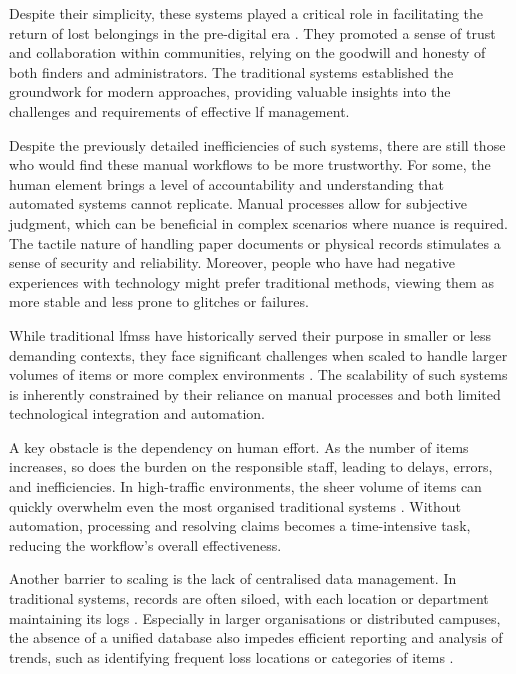 Despite their simplicity, these systems played a critical role in facilitating the return of lost belongings in the pre-digital era \cite{Mayura2024}. They promoted a sense of trust and collaboration within communities, relying on the goodwill and honesty of both finders and administrators. The traditional systems established the groundwork for modern approaches, providing valuable insights into the challenges and requirements of effective \ac{lf} management.

Despite the previously detailed inefficiencies of such systems, there are still those who would find these manual workflows to be more trustworthy. For some, the human element brings a level of accountability and understanding that automated systems cannot replicate. Manual processes allow for subjective judgment, which can be beneficial in complex scenarios where nuance is required. The tactile nature of handling paper documents or physical records stimulates a sense of security and reliability. Moreover, people who have had negative experiences with technology might prefer traditional methods, viewing them as more stable and less prone to glitches or failures.


While traditional \acp{lfms} have historically served their purpose in smaller or less demanding contexts, they face significant challenges when scaled to handle larger volumes of items or more complex environments \cite{Mayura2024}. The scalability of such systems is inherently constrained by their reliance on manual processes and both limited technological integration and automation.

A key obstacle is the dependency on human effort. As the number of items increases, so does the burden on the responsible staff, leading to delays, errors, and inefficiencies. In high-traffic environments, the sheer volume of items can quickly overwhelm even the most organised traditional systems \cite{Yao2019}. Without automation, processing and resolving claims becomes a time-intensive task, reducing the workflow's overall effectiveness. 

Another barrier to scaling is the lack of centralised data management. In traditional systems, records are often siloed, with each location or department maintaining its logs \cite{Soumya2024}. Especially in larger organisations or distributed campuses, the absence of a unified database also impedes efficient reporting and analysis of trends, such as identifying frequent loss locations or categories of items \cites{Sinha2024, Soumya2024}.

